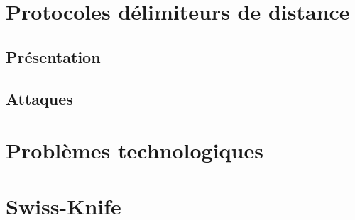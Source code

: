 \documentclass{beamer}
\begin{document}
\section{Protocoles délimiteurs de distance}

\subsection{Présentation}

\subsection{Attaques}

\section{Problèmes technologiques}

\section{Swiss-Knife}
\end{document}

